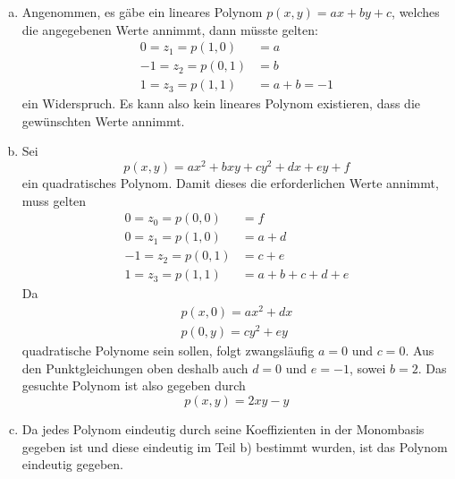 \documentclass{mywork}
\begin{document}
\begin{aufgabe}
		\begin{enumerate}[a)]
			\item
				Angenommen, es gäbe ein lineares Polynom $p(x,y) = ax + by + c$, welches die angegebenen Werte annimmt, dann müsste gelten:
				\begin{align*}
					0 = z_1 = p(1,0) &= a \\
					-1 = z_2 = p(0,1) &= b \\
					1 = z_3 = p(1,1) &= a + b = -1
				\end{align*}
				ein Widerspruch.
				Es kann also kein lineares Polynom existieren, dass die gewünschten Werte annimmt.
			\item
				Sei
				\[
					p(x,y) = ax^2 + bxy + cy^2 + dx + ey + f
				\]
				ein quadratisches Polynom.
				Damit dieses die erforderlichen Werte annimmt, muss gelten
				\begin{align*}
					0 = z_0 = p(0,0) &= f \\
					0 = z_1 = p(1,0) &= a + d \\
					-1 = z_2 = p(0,1) &= c + e \\
					1 = z_3 = p(1,1) &= a + b + c + d + e
				\end{align*}
				Da
				\begin{align*}
					p(x,0) = ax^2 + dx \\
					p(0,y) = cy^2 + ey
				\end{align*}
				quadratische Polynome sein sollen, folgt zwangsläufig $a=0$ und $c=0$.
				Aus den Punktgleichungen oben deshalb auch $d=0$ und $e=-1$, sowei $b=2$.
				Das gesuchte Polynom ist also gegeben durch
				\[
					p(x,y) = 2xy - y
				\]
			\item
				Da jedes Polynom eindeutig durch seine Koeffizienten in der Monombasis gegeben ist und diese eindeutig im Teil b) bestimmt wurden, ist das Polynom eindeutig gegeben.
		\end{enumerate}
\end{aufgabe}
\end{document}
